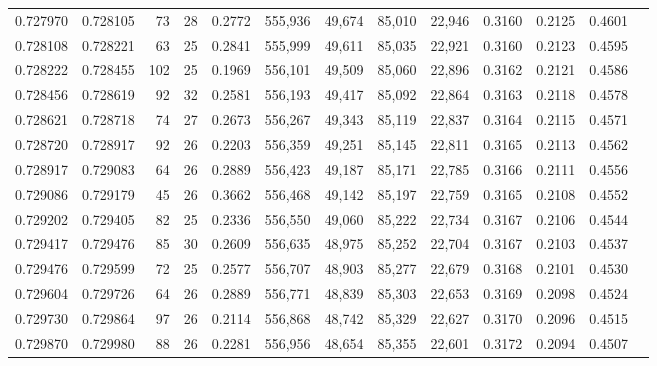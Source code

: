 \begin{tabular}{rrrrrrrrrrrrr}
0.727970 & 0.728105 &    73 &  28 &                                     0.2772 & 555,936 &  49,674 &  85,010 &  22,946 & 0.3160 & 0.2125 & 0.4601 \\
0.728108 & 0.728221 &    63 &  25 &                                     0.2841 & 555,999 &  49,611 &  85,035 &  22,921 & 0.3160 & 0.2123 & 0.4595 \\
0.728222 & 0.728455 &   102 &  25 &                                     0.1969 & 556,101 &  49,509 &  85,060 &  22,896 & 0.3162 & 0.2121 & 0.4586 \\
0.728456 & 0.728619 &    92 &  32 &                                     0.2581 & 556,193 &  49,417 &  85,092 &  22,864 & 0.3163 & 0.2118 & 0.4578 \\
0.728621 & 0.728718 &    74 &  27 &                                     0.2673 & 556,267 &  49,343 &  85,119 &  22,837 & 0.3164 & 0.2115 & 0.4571 \\
0.728720 & 0.728917 &    92 &  26 &                                     0.2203 & 556,359 &  49,251 &  85,145 &  22,811 & 0.3165 & 0.2113 & 0.4562 \\
0.728917 & 0.729083 &    64 &  26 &                                     0.2889 & 556,423 &  49,187 &  85,171 &  22,785 & 0.3166 & 0.2111 & 0.4556 \\
0.729086 & 0.729179 &    45 &  26 &                                     0.3662 & 556,468 &  49,142 &  85,197 &  22,759 & 0.3165 & 0.2108 & 0.4552 \\
0.729202 & 0.729405 &    82 &  25 &                                     0.2336 & 556,550 &  49,060 &  85,222 &  22,734 & 0.3167 & 0.2106 & 0.4544 \\
0.729417 & 0.729476 &    85 &  30 &                                     0.2609 & 556,635 &  48,975 &  85,252 &  22,704 & 0.3167 & 0.2103 & 0.4537 \\
0.729476 & 0.729599 &    72 &  25 &                                     0.2577 & 556,707 &  48,903 &  85,277 &  22,679 & 0.3168 & 0.2101 & 0.4530 \\
0.729604 & 0.729726 &    64 &  26 &                                     0.2889 & 556,771 &  48,839 &  85,303 &  22,653 & 0.3169 & 0.2098 & 0.4524 \\
0.729730 & 0.729864 &    97 &  26 &                                     0.2114 & 556,868 &  48,742 &  85,329 &  22,627 & 0.3170 & 0.2096 & 0.4515 \\
0.729870 & 0.729980 &    88 &  26 &                                     0.2281 & 556,956 &  48,654 &  85,355 &  22,601 & 0.3172 & 0.2094 & 0.4507 \\

\end{tabular}
